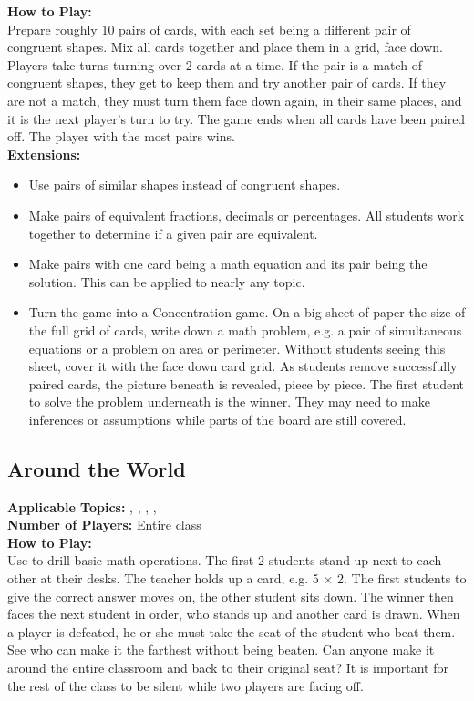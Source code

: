 	\noindent \textbf{How to Play:}\\
	Prepare roughly 10 pairs of cards, with each set being a different pair of congruent shapes. Mix all cards together and place them in a grid, face down. Players take turns turning over 2 cards at a time. If the pair is a match of congruent shapes, they get to keep them and try another pair of cards. If they are not a match, they must turn them face down again, in their same places, and it is the next player's turn to try. The game ends when all cards have been paired off. The player with the most pairs wins.\\
	
	\noindent \textbf{Extensions:}
	\begin{itemize}
	\item Use pairs of similar shapes instead of congruent shapes.
	\item Make pairs of equivalent fractions, decimals or percentages. All students work together to determine if a given pair are equivalent.
	\item Make pairs with one card being a math equation and its pair being the solution. This can be applied to nearly any topic.
	\item Turn the game into a Concentration game. On a big sheet of paper the size of the full grid of cards, write down a math problem, e.g. a pair of simultaneous equations or a problem on area or perimeter. Without students seeing this sheet, cover it with the face down card grid. As students remove successfully paired cards, the picture beneath is revealed, piece by piece. The first student to solve the problem underneath is the winner. They may need to make inferences or assumptions while parts of the board are still covered.
	\end{itemize}
		
	\subsection{Around the World} \label{aroundtheworld}	
	\textbf{Applicable Topics:} , , , , \\	
	\textbf{Number of Players:} Entire class\\
	
	\noindent \textbf{How to Play:}\\
	Use  to drill basic math operations. The first 2 students stand up next to each other at their desks. The teacher holds up a card, e.g. 5 $\times$ 2. The first students to give the correct answer moves on, the other student sits down. The winner then faces the next student in order, who stands up and another card is drawn. When a player is defeated, he or she must take the seat of the student who beat them. See who can make it the farthest without being beaten. Can anyone make it around the entire classroom and back to their original seat? It is important for the rest of the class to be silent while two players are facing off.\\
	
